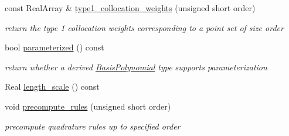 \begin{DoxyCompactItemize}
const Real\+Array \& \hyperlink{classPecos_1_1NumericGenOrthogPolynomial_aa010321cf47465dca5725fa15ba58bf6}{type1\+\_\+collocation\+\_\+weights} (unsigned short order)
\begin{DoxyCompactList}\small\item\em return the type 1 collocation weights corresponding to a point set of size order \end{DoxyCompactList}\item 
bool \hyperlink{classPecos_1_1NumericGenOrthogPolynomial_abc2afafc150f648667a41e0ce656b6da}{parameterized} () const \label{classPecos_1_1NumericGenOrthogPolynomial_abc2afafc150f648667a41e0ce656b6da}

\begin{DoxyCompactList}\small\item\em return whether a derived \hyperlink{classPecos_1_1BasisPolynomial}{Basis\+Polynomial} type supports parameterization \end{DoxyCompactList}\item 
Real \hyperlink{classPecos_1_1NumericGenOrthogPolynomial_a8c1e8d014e82efc5a1c20f973b5bc715}{length\+\_\+scale} () const 
\item 
void \hyperlink{classPecos_1_1NumericGenOrthogPolynomial_ad1f50a6d03d3b48687bf9c4ca889b389}{precompute\+\_\+rules} (unsigned short order)\label{classPecos_1_1NumericGenOrthogPolynomial_ad1f50a6d03d3b48687bf9c4ca889b389}

\begin{DoxyCompactList}\small\item\em precompute quadrature rules up to specified order \end{DoxyCompactList}\end{DoxyCompactItemize}
